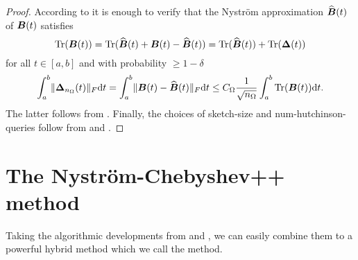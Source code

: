\begin{proof}
    According to  it is enough to verify that the Nystr\"om approximation $\widehat{\boldsymbol{B}}(t)$ of $\boldsymbol{B}(t)$ satisfies
    \begin{equation}
        \operatorname{Tr}(\boldsymbol{B}(t)) = \operatorname{Tr}(\widehat{\boldsymbol{B}}(t) + \boldsymbol{B}(t) - \widehat{\boldsymbol{B}}(t)) = \operatorname{Tr}(\widehat{\boldsymbol{B}}(t)) + \operatorname{Tr}(\boldsymbol{\Delta}(t))
    \end{equation}
    for all $t \in [a, b]$ and with probability $\geq 1 - \delta$
    \begin{equation}
        \int_{a}^{b} \lVert \boldsymbol{\Delta}_{n_{\Omega}}(t) \rVert _F \mathrm{d}t = \int_{a}^{b} \lVert \boldsymbol{B}(t) - \widehat{\boldsymbol{B}}(t) \rVert _F \mathrm{d}t \leq C_{\Omega} \frac{1}{\sqrt{n_{\Omega}}} \int_{a}^{b} \operatorname{Tr}(\boldsymbol{B}(t)) \mathrm{d}t.
    \end{equation}
    The latter follows from . Finally, the choices of \gls{sketch-size} and \gls{num-hutchinson-queries} follow from  and .
\end{proof}


\section{The Nystr\"om-Chebyshev++ method}
\label{sec:4-nystromchebyshev-nystromchebyshev-pp}

Taking the algorithmic developments from  and ,
we can easily combine them to a powerful hybrid method which we call the 
method.

